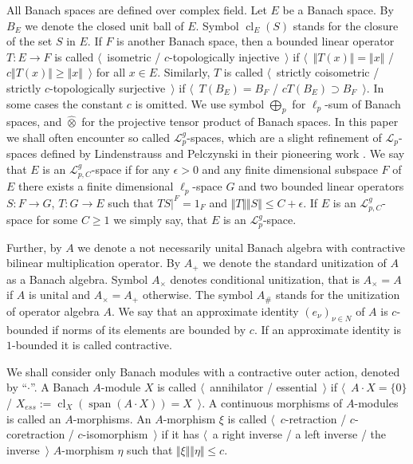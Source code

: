 \documentclass[12pt]{article}
\newcommand{\projtens}{\mathbin{\widehat{\otimes}}}
\begin{document}
All Banach spaces are defined over complex field. Let $E$ be a Banach space. By $B_E$ we denote the closed unit ball of $E$. Symbol $\operatorname{cl}_E(S)$ stands for the closure of the set $S$ in $E$. If $F$ is another Banach space, then a bounded linear operator $T:E\to F$ is called $\langle$~isometric / $c$-topologically injective~$\rangle$ if $\langle$~$\Vert T(x)\Vert=\Vert x\Vert$ / $c\Vert T(x)\Vert\geq\Vert x\Vert$~$\rangle$ for all $x\in E$. Similarly, $T$ is called $\langle$~strictly coisometric / strictly $c$-topologically surjective~$\rangle$ if $\langle$~$T(B_E)=B_F$ / $c T(B_E)\supset B_F$~$\rangle$. In some cases the constant $c$ is omitted. We use symbol $\bigoplus_p$ for $\ell_p$-sum of Banach spaces, and $\projtens$ for the projective tensor product of Banach spaces. In this paper we shall often encounter so called $\mathcal{L}_p^g$-spaces, which are a slight refinement of $\mathcal{L}_p$-spaces defined by Lindenstrauss and Pelczynski in their pioneering work \cite{LinPelAbsSumOpInLpSpAndApp}. We say that $E$ is an $\mathcal{L}_{p,C}^g$-space if for any $\epsilon>0$ and any finite dimensional subspace $F$ of $E$ there exists a finite dimensional $\ell_p$-space $G$ and two bounded linear operators $S:F\to G$, $T:G\to E$ such that $TS|^F=1_F$ and $\Vert T\Vert\Vert S\Vert\leq C+\epsilon$. If $E$ is an $\mathcal{L}_{p,C}^g$-space for some $C\geq 1$ we simply say, that $E$ is an $\mathcal{L}_p^g$-space.

Further, by $A$ we denote a not necessarily unital Banach algebra with contractive bilinear multiplication operator. By $A_+$ we denote the standard unitization of $A$ as a Banach algebra. Symbol $A_\times$ denotes conditional unitization, that is $A_\times=A$ if $A$ is unital and $A_\times=A_+$ otherwise. The symbol $A_\#$ stands for the unitization of operator algebra $A$. We say that an approximate identity $(e_\nu)_{\nu\in N}$ of $A$ is $c$-bounded if norms of its elements are bounded by $c$. If an approximate identity is $1$-bounded it is called contractive.

We shall consider only Banach modules with a contractive outer action, denoted by ``$\cdot$''. A Banach $A$-module $X$ is called $\langle$~annihilator / essential~$\rangle$ if $\langle$~$A\cdot X=\{0\}$ / $X_{ess}:=\operatorname{cl}_X(\operatorname{span}(A\cdot X))=X$~$\rangle$. A continuous morphisms of $A$-modules is called an $A$-morphisms. An $A$-morphism $\xi$ is called $\langle$~$c$-retraction / $c$-coretraction / $c$-isomorphism~$\rangle$ if it has $\langle$~a right inverse / a left inverse / the inverse~$\rangle$ $A$-morphism $\eta$ such that $\Vert\xi\Vert\Vert\eta\Vert\leq c$.
\end{document}

